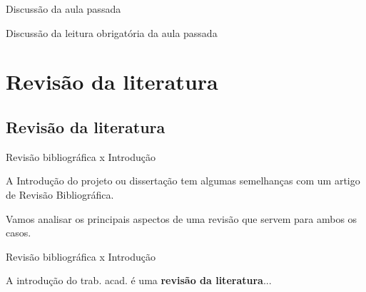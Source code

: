 \documentclass{beamer}
\begin{document}

\begin{frame}{Discussão da aula passada}
  \begin{block}{}
    Discussão da leitura obrigatória da aula passada
  \end{block}
\end{frame}

\section{Revisão da literatura}

\subsection{Revisão da literatura}

\begin{frame}{Revisão bibliográfica x Introdução}
  \begin{block}{}
    \footnotesize
    A Introdução do projeto ou dissertação tem algumas semelhanças com
    um artigo de Revisão Bibliográfica.

    \bigskip

    Vamos analisar os principais aspectos de uma revisão que servem
    para ambos os casos.
  \end{block}
\end{frame}

\begin{frame}{Revisão bibliográfica x Introdução}
  \begin{center}
    \footnotesize
    A introdução do trab. acad. é uma {\bf revisão da literatura}...

    \bigskip
    \normalsize
  \end{center}

  \vfill
\end{frame}
\end{document}

